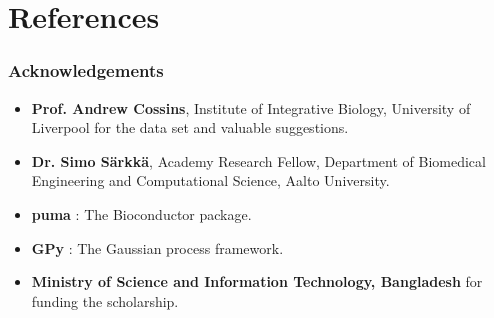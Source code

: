 \documentclass{beamer}
\begin{document}
\section{References}
\begin{frame}[fragile] %
\frametitle{Acknowledgements}

\begin{itemize}
\item {\bf Prof. Andrew Cossins}, Institute of Integrative Biology, University of Liverpool for the data set and valuable suggestions. \\
\item {\bf Dr. Simo S\"arkk\"a}, Academy Research Fellow, Department of Biomedical Engineering and Computational Science, Aalto University. \\
\item {\bf puma} : The Bioconductor package. \\
\item {\bf GPy} : The Gaussian process framework. \\
\item {\bf Ministry of Science and Information Technology, Bangladesh} for funding the scholarship.

\end{itemize}


\end{frame}

\end{document}
